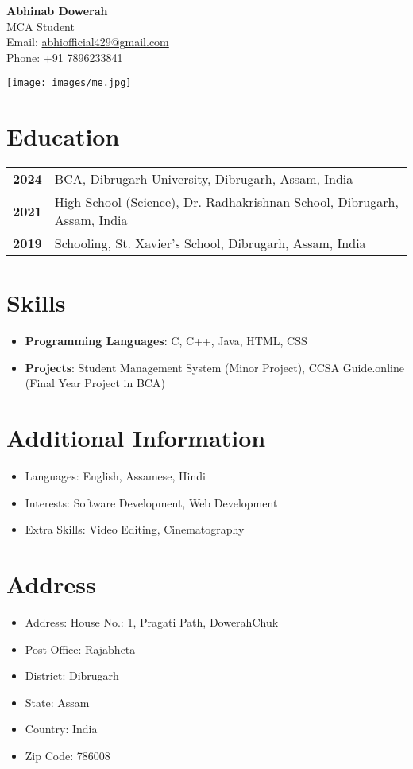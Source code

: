\documentclass[a4paper,10pt]{article}
\title{\vspace{-3cm}}
\date{}
\begin{document}
\begin{minipage}{0.7\textwidth}
    \raggedright
    \textbf{\LARGE Abhinab Dowerah} \\
    \vspace{0.2cm}
    \textcolor{accentcolor}{\large MCA Student} \\
    \vspace{0.2cm}
    \small
    Email: \href{mailto:abhiofficial429@gmail.com}{abhiofficial429@gmail.com} \\
    Phone: +91 7896233841
\end{minipage}
\hspace{0.05\textwidth} 
\begin{minipage}{0.2\textwidth}
    \raggedleft
    \texttt{[image: images/me.jpg]} 
\end{minipage}

\vspace{0.5cm}


\section*{Education}
\begin{tabular}{>{\bfseries}p{} p{}}
2024 & BCA, Dibrugarh University, Dibrugarh, Assam, India \\
2021 & High School (Science), Dr. Radhakrishnan School, Dibrugarh, Assam, India \\
2019 & Schooling, St. Xavier's School, Dibrugarh, Assam, India \\
\end{tabular}

\section*{Skills}
\begin{itemize}
    \item \textbf{Programming Languages}: C, C++, Java, HTML, CSS
    \item \textbf{Projects}: Student Management System (Minor Project), CCSA Guide.online (Final Year Project in BCA)
\end{itemize}

\section*{Additional Information}
\begin{itemize}
    \item Languages: English, Assamese, Hindi
    \item Interests: Software Development, Web Development
    \item Extra Skills: Video Editing, Cinematography 
\end{itemize}

\section*{Address}
\begin{itemize}
    \item Address: House No.: 1, Pragati Path, DowerahChuk
    \item Post Office: Rajabheta 
    \item District:  Dibrugarh
    \item State: Assam
    \item Country: India
    \item Zip Code: 786008
\end{itemize}
\end{document}
